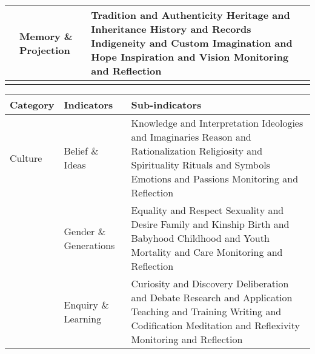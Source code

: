 \begin{table}[th]
\begin{center}
\begin{tabular}{ >{\raggedright\arraybackslash}p{} >{\raggedright\arraybackslash}p{} >{\raggedright\arraybackslash}p{} }
  & Memory \& Projection & Tradition and Authenticity \linebreak Heritage and Inheritance \linebreak History and Records \linebreak Indigeneity and Custom \linebreak Imagination and Hope \linebreak Inspiration and Vision \linebreak Monitoring and Reflection \\
\hline
\label{tbl:incomesByUfarmens3}
\end{tabular}
\end{center}
\end{table}

\begin{table}[th]
\begin{center}
\begin{tabular}{ >{\raggedright\arraybackslash}p{} >{\raggedright\arraybackslash}p{} >{\raggedright\arraybackslash}p{} }
\hline
Category & Indicators & Sub-indicators \\
\hline
Culture & Belief \& Ideas & Knowledge and Interpretation \linebreak Ideologies and Imaginaries \linebreak Reason and Rationalization \linebreak Religiosity and Spirituality \linebreak Rituals and Symbols \linebreak Emotions and Passions \linebreak Monitoring and Reflection \linebreak \\
  & Gender \& Generations & Equality and Respect \linebreak Sexuality and Desire \linebreak Family and Kinship \linebreak Birth and Babyhood \linebreak Childhood and Youth \linebreak Mortality and Care \linebreak Monitoring and Reflection \linebreak \\
  & Enquiry \& Learning & Curiosity and Discovery \linebreak Deliberation and Debate \linebreak Research and Application \linebreak Teaching and Training \linebreak Writing and Codification \linebreak Meditation and Reflexivity \linebreak Monitoring and Reflection \linebreak \\

\end{tabular}
\end{center}
\end{table}
